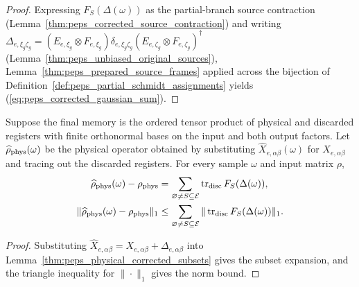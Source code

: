 \begin{proof}\leanok
    Expressing $F_S(\Delta(\omega))$ as the partial-branch source contraction (Lemma~\ref{thm:peps_corrected_source_contraction}) and writing $\Delta_{e,\xi_g\zeta_g}=(E_{e,\xi_g}\otimes F_{e,\xi_g})\delta_{e,\xi_g\zeta_g}(E_{e,\zeta_g}\otimes F_{e,\zeta_g})^{\dagger}$ (Lemma~\ref{thm:peps_unbiased_original_sources}), Lemma~\ref{thm:peps_prepared_source_frames} applied across the bijection of Definition~\ref{def:peps_partial_schmidt_assignments} yields (\ref{eq:peps_corrected_gaussian_sum}).
\end{proof}

\begin{lemma}
    \label{thm:peps_sampled_physical_error}
    \leanok
    Suppose the final memory is the ordered tensor product of physical and discarded registers with finite orthonormal bases on the input and both output factors. Let $\widehat\rho_{\rm phys}(\omega)$ be the physical operator obtained by substituting $\widehat X_{e,\alpha\beta}(\omega)$ for $X_{e,\alpha\beta}$ and tracing out the discarded registers. For every sample $\omega$ and input matrix $\rho$,
    \begin{align}
        \widehat\rho_{\rm phys}(\omega)-\rho_{\rm phys}
         & =\sum_{\varnothing\ne S\subseteq\mathcal E}
        \operatorname{tr}_{\rm disc}F_S(\Delta(\omega)),  \\
        \|\widehat\rho_{\rm phys}(\omega)-\rho_{\rm phys}\|_1
         & \leq\sum_{\varnothing\ne S\subseteq\mathcal E}
        \|\operatorname{tr}_{\rm disc}F_S(\Delta(\omega))\|_1.
    \end{align}
\end{lemma}

\begin{proof}\leanok
    Substituting $\widehat X_{e,\alpha\beta}=X_{e,\alpha\beta}+\Delta_{e,\alpha\beta}$ into Lemma~\ref{thm:peps_physical_corrected_subsets} gives the subset expansion, and the triangle inequality for $\|\cdot\|_1$ gives the norm bound.
\end{proof}
